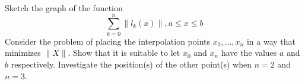 \begin{problem}
  Sketch the graph of the function
  \begin{equation*}
    \sum_{k=0}^n\|l_k(x)\|, a \leq x \leq b
  \end{equation*}
  Consider the problem of placing the interpolation points ${x_0,
    \dots, x_n }$ in a way that minimizes $\|X\|$. Show that it is
  suitable to let $x_0$ and $x_n$ have the values $a$ and $b$
  respectively. Investigate the position(s) of the other point(s) when
  $n = 2$ and $n = 3$.
\end{problem}


\begin{solution}  

\end{solution}

